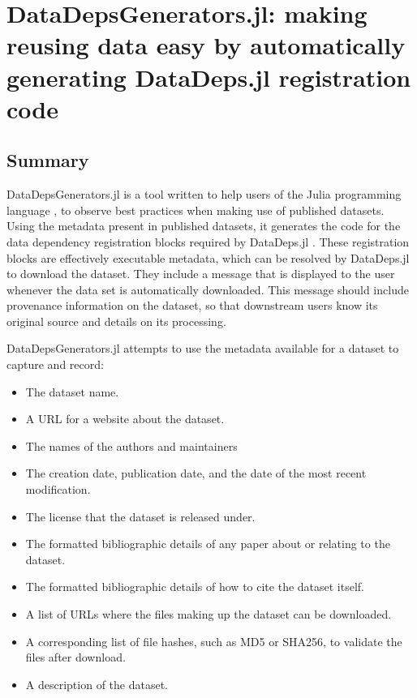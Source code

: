 \documentclass{book}
\begin{document}
\chapter{DataDepsGenerators.jl: making reusing data easy by automatically generating DataDeps.jl registration code}


\hypertarget{summary}{%
	\section{Summary}\label{summary}}

DataDepsGenerators.jl is a tool written to help users of the Julia
programming language \citep{Julia}, to observe best practices when
making use of published datasets. Using the metadata present in
published datasets, it generates the code for the data dependency
registration blocks required by DataDeps.jl
\citep{2018arXiv180801091W}. These registration blocks are effectively
executable metadata, which can be resolved by DataDeps.jl to download
the dataset. They include a message that is displayed to the user
whenever the data set is automatically downloaded. This message should
include provenance information on the dataset, so that downstream users
know its original source and details on its processing.

DataDepsGenerators.jl attempts to use the metadata available for a
dataset to capture and record:

\begin{itemize}
	
	\item
	The dataset name.
	\item
	A URL for a website about the dataset.
	\item
	The names of the authors and maintainers
	\item
	The creation date, publication date, and the date of the most recent
	modification.
	\item
	The license that the dataset is released under.
	\item
	The formatted bibliographic details of any paper about or relating to
	the dataset.
	\item
	The formatted bibliographic details of how to cite the dataset itself.
	\item
	A list of URLs where the files making up the dataset can be
	downloaded.
	\item
	A corresponding list of file hashes, such as MD5 or SHA256, to
	validate the files after download.
	\item
	A description of the dataset.
\end{itemize}
\end{document}
